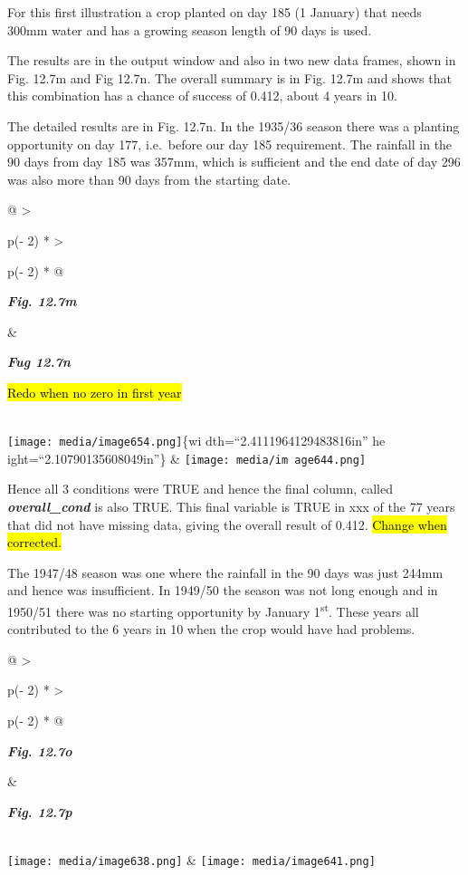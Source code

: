 \documentclass[
  letterpaper,
  DIV=11,
  numbers=noendperiod]{scrreprt}
\begin{document}
For this first illustration a crop planted on day 185 (1 January) that
needs 300mm water and has a growing season length of 90 days is used.

The results are in the output window and also in two new data frames,
shown in Fig. 12.7m and Fig 12.7n. The overall summary is in Fig. 12.7m
and shows that this combination has a chance of success of 0.412, about
4 years in 10.

The detailed results are in Fig. 12.7n. In the 1935/36 season there was
a planting opportunity on day 177, i.e.~before our day 185 requirement.
The rainfall in the 90 days from day 185 was 357mm, which is sufficient
and the end date of day 296 was also more than 90 days from the starting
date.

\begin{longtable}[]{@{}
  >{\raggedright\arraybackslash}p{(\columnwidth - 2\tabcolsep) * }
  >{\raggedright\arraybackslash}p{(\columnwidth - 2\tabcolsep) * }@{}}
\toprule\noalign{}
\begin{minipage}[b]{\linewidth}\raggedright
\textbf{\emph{Fig. 12.7m}}
\end{minipage} & \begin{minipage}[b]{\linewidth}\raggedright
\textbf{\emph{Fug 12.7n}}

\hl{Redo when no zero in first year}
\end{minipage} \\
\midrule\noalign{}
\endhead
\bottomrule\noalign{}
\endlastfoot
\texttt{[image: media/image654.png]}\{wi dth=``2.4111964129483816in'' he
ight=``2.10790135608049in''\} &
\texttt{[image: media/im age644.png]} \\
\end{longtable}

Hence all 3 conditions were TRUE and hence the final column, called
\textbf{\emph{overall\_cond}} is also TRUE. This final variable is TRUE
in xxx of the 77 years that did not have missing data, giving the
overall result of 0.412. \hl{Change when corrected.}

The 1947/48 season was one where the rainfall in the 90 days was just
244mm and hence was insufficient. In 1949/50 the season was not long
enough and in 1950/51 there was no starting opportunity by January
1\textsuperscript{st}. These years all contributed to the 6 years in 10
when the crop would have had problems.

\begin{longtable}[]{@{}
  >{\raggedright\arraybackslash}p{(\columnwidth - 2\tabcolsep) * }
  >{\raggedright\arraybackslash}p{(\columnwidth - 2\tabcolsep) * }@{}}
\toprule\noalign{}
\begin{minipage}[b]{\linewidth}\raggedright
\textbf{\emph{Fig. 12.7o}}
\end{minipage} & \begin{minipage}[b]{\linewidth}\raggedright
\textbf{\emph{Fig. 12.7p}}
\end{minipage} \\
\midrule\noalign{}
\endhead
\bottomrule\noalign{}
\endlastfoot
\texttt{[image: media/image638.png]} &
\texttt{[image: media/image641.png]} \\
\end{longtable}
\end{document}
